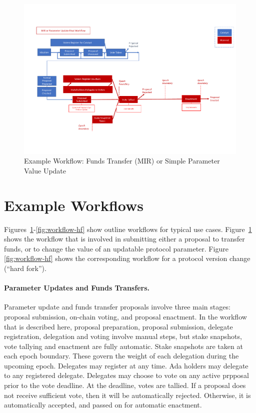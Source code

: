 \begin{figure}
  \includegraphics[trim=0 90 0 80,clip,width=\textwidth]{Workflow3}
  \caption{Example Workflow: Funds Transfer (MIR) or Simple Parameter Value Update}
  \label{fig:workflow-mir}
\end{figure}

\section{Example Workflows}
\label{sec:workflows}

Figures~\ref{fig:workflow-mir}-\ref{fig:workflow-hf} show outline workflows for
typical use cases.  Figure~\ref{fig:workflow-mir} shows the workflow that is
involved in submitting either a proposal to transfer funds, or to change the
value of an updatable protocol parameter.  Figure \ref{fig:workflow-hf} shows
the corresponding workflow for a protocol version change (``hard fork'').

\paragraph{Parameter Updates and Funds Transfers.}  Parameter update and funds transfer proposals involve three main stages:
proposal submission, on-chain voting, and proposal enactment.  In the workflow that is described
here, proposal preparation, proposal submission, delegate registration,
delegation and voting involve manual steps, but stake snapshots, vote tallying
and enactment are fully automatic.  Stake snapshots are taken at each epoch boundary.
These govern the weight of each delegation during the upcoming epoch.
%
Delegates may register at any time.  Ada holders may delegate to any registered delegate.
Delegates may choose to vote on any active prpposal prior to the vote deadline.
At the deadline, votes are tallied.  If a proposal does not receive sufficient vote, then
it will be automatically rejected.  Otherwise, it is automatically accepted, and passed on for
automatic enactment.

